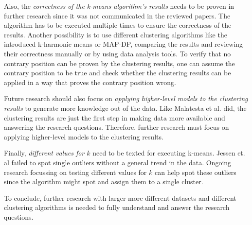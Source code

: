 Also, the \textit{correctness of the k-means algorithm's results} needs to be proven in further research since it was not communicated in the reviewed papers.
The algorithm has to be executed multiple times to ensure the correctness of the results.
Another possibility is to use different clustering algorithms like the introduced k-harmonic means or MAP-DP, comparing the results and reviewing their correctness manually or by using data analysis tools.
To verify that no contrary position can be proven by the clustering results, one can assume the contrary position to be true and check whether the clustering results can be applied in a way that proves the contrary position wrong.

Future research should also focus on \textit{applying higher-level models to the clustering results} to generate more knowledge out of the data.
Like Malatesta et al. \cite{MAL-HBP} did, the clustering results are just the first step in making data more available and answering the research questions.
Therefore, further research must focus on applying higher-level models to the clustering results.

Finally, \textit{different values for $k$} need to be texted for executing k-means.
Jessen et. al \cite{JES-IND} failed to spot single outliers without a general trend in the data.
Ongoing research focussing on testing different values for $k$ can help spot these outliers since the algorithm might spot and assign them to a single cluster.

To conclude, further research with larger more different datasets and different clustering algorithms is needed to fully understand and answer the research questions.

